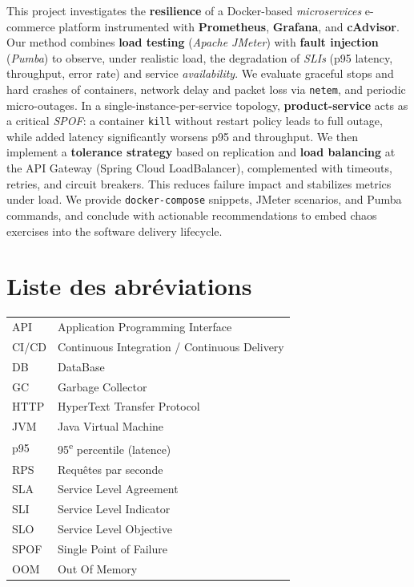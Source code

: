 \documentclass[a4paper,12pt,twoside]{report}
\begin{document}
This project investigates the \textbf{resilience} of a Docker-based \textit{microservices} e-commerce platform instrumented with \textbf{Prometheus}, \textbf{Grafana}, and \textbf{cAdvisor}. 
Our method combines \textbf{load testing} (\textit{Apache JMeter}) with \textbf{fault injection} (\textit{Pumba}) to observe, under realistic load, the degradation of \textit{SLIs} (p95 latency, throughput, error rate) and service \textit{availability}. 
We evaluate graceful stops and hard crashes of containers, network delay and packet loss via \texttt{netem}, and periodic micro-outages. 
In a single-instance-per-service topology, \textbf{product-service} acts as a critical \textit{SPOF}: a container \texttt{kill} without restart policy leads to full outage, while added latency significantly worsens p95 and throughput. 
We then implement a \textbf{tolerance strategy} based on replication and \textbf{load balancing} at the API Gateway (Spring Cloud LoadBalancer), complemented with timeouts, retries, and circuit breakers. 
This reduces failure impact and stabilizes metrics under load. 
We provide \texttt{docker-compose} snippets, JMeter scenarios, and Pumba commands, and conclude with actionable recommendations to embed chaos exercises into the software delivery lifecycle.



\tableofcontents
\listoffigures
\listoftables
\newpage

\chapter*{Liste des abréviations}
\begin{tabular}{@{}ll@{}}
API & Application Programming Interface\\
CI/CD & Continuous Integration / Continuous Delivery\\
DB & DataBase\\
GC & Garbage Collector\\
HTTP & HyperText Transfer Protocol\\
JVM & Java Virtual Machine\\
p95 & 95\textsuperscript{e} percentile (latence)\\
RPS & Requêtes par seconde\\
SLA & Service Level Agreement\\
SLI & Service Level Indicator\\
SLO & Service Level Objective\\
SPOF & Single Point of Failure\\
OOM & Out Of Memory\\
\end{tabular}
\end{document}
